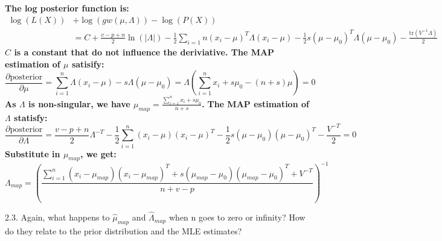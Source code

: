 \documentclass{article}
\theoremstyle{definition}
\theoremstyle{definition}
\theoremstyle{remark}
\begin{document}
\begin{addmargin}[3em]{2em}
  \textbf{The log posterior function is:}
  \[
  \begin{split}
    \log(L(X)) & + \log(gw(\mu, \Lambda)) - \log(P(X))\\
    & = C + \frac{v-p+n}{2}\ln(|\Lambda|) - \frac{1}{2} \sum_{i=1}{n} (x_i - \mu)^T \Lambda (x_i - \mu) - \frac{1}{2}s(\mu - \mu_0)^T \Lambda (\mu - \mu_0) - \frac{\mbox{tr}(V^{-1}\Lambda)}{2}
  \end{split}
  \]
  \textbf{$C$ is a constant that do not influence the deriviative. The MAP estimation of $\mu$ satisify:}
  \[
  \frac{\partial \mbox{posterior}}{\partial \mu} = \sum_{i=1}^n \Lambda (x_i - \mu) - s \Lambda (\mu - \mu_0) = \Lambda (\sum_{i=1}^n x_i + s\mu_0 - (n+s)\mu) = 0
  \]
  \textbf{As $\Lambda$ is non-singular, we have $\mu_{map} = \frac{\sum_{i=1}^n x_i + s\mu_0}{n + s}$.}
  \textbf{The MAP estimation of $\Lambda$ statisfy:}
  \[
  \frac{\partial \mbox{posterior}}{\partial \Lambda} = \frac{v - p + n}{2}\Lambda^{-T} - \frac{1}{2} \sum_{i=1}^n (x_i - \mu)(x_i - \mu)^T - \frac{1}{2} s (\mu - \mu_0)(\mu - \mu_0)^T - \frac{V^{-T}}{2} = 0
  \]
  \textbf{Substitute in $\mu_{map}$, we get:}
  \[
  \Lambda_{map} = {(\frac{\sum_{i=1}^n (x_i - \mu_{map}){(x_i - \mu_{map})}^T + s(\mu_{map} - \mu_0) (\mu_{map} - \mu_0)^T + V^{-T}}{n + v - p})}^{-1}
  \]

\end{addmargin}

2.3. Again, what happens to $\hat{\mu}_{map}$ and $\hat{\Lambda}_{map}$ when n goes to zero or infinity?
How do they relate to the prior distribution and the MLE
estimates?
\end{document}
